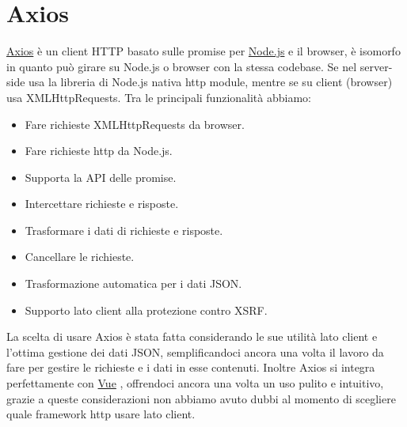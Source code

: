 \documentclass[a4paper,12pt]{report}
\newcommand{\node}{\href{https://nodejs.org/it/}{Node.js} }
\newcommand{\vue}{\href{https://vuejs.org/}{Vue} }
\newcommand{\axios}{\href{https://axios-http.com/}{Axios} }
\begin{document}
\section{Axios}
\axios è un client HTTP basato sulle promise per \node e il browser, è isomorfo in quanto può girare su Node.js o browser con la stessa codebase. Se nel server-side usa la libreria di Node.js nativa http module, mentre se su client (browser) usa XMLHttpRequests.
Tra le principali funzionalità abbiamo:
\begin{itemize}
	\item Fare richieste XMLHttpRequests da browser.
	\item Fare richieste http da Node.js.
	\item Supporta la API delle promise.
	\item Intercettare richieste e risposte.
	\item Trasformare i dati di richieste e risposte.
	\item Cancellare le richieste.
	\item Trasformazione automatica per i dati JSON.
	\item Supporto lato client alla protezione contro XSRF.
\end{itemize}
La scelta di usare Axios è stata fatta considerando le sue utilità lato client e l'ottima gestione dei dati JSON, semplificandoci ancora una volta il lavoro da fare per gestire le richieste e i dati in esse contenuti. Inoltre Axios si integra perfettamente con \vue, offrendoci ancora una volta un uso pulito e intuitivo, grazie a queste considerazioni non abbiamo avuto dubbi al momento di scegliere quale framework http usare lato client.
\end{document}
